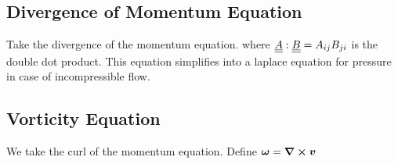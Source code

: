 \subsection{Divergence of Momentum Equation}
Take the divergence of the momentum equation.
where $\underline{\underline{A}}:\underline{\underline{B}}=A_{ij}B_{ji}$ is the double dot product. This equation simplifies into a laplace equation for pressure in case of incompressible flow.
\subsection{Vorticity Equation}
We take the curl of the momentum equation. Define $\boldsymbol{\omega}=\boldsymbol{\nabla}\cross\boldsymbol{v}$
